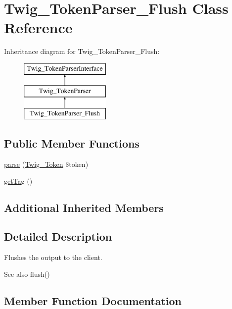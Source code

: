 \hypertarget{class_twig___token_parser___flush}{}\section{Twig\+\_\+\+Token\+Parser\+\_\+\+Flush Class Reference}
\label{class_twig___token_parser___flush}
Inheritance diagram for Twig\+\_\+\+Token\+Parser\+\_\+\+Flush\+:\begin{figure}[H]
\begin{center}
\leavevmode
\includegraphics[height=3.000000cm]{class_twig___token_parser___flush}
\end{center}
\end{figure}
\subsection*{Public Member Functions}
\begin{DoxyCompactItemize}
\item 
\hyperlink{class_twig___token_parser___flush_a5dfa2e269321584fb74e8b43dabe0efd}{parse} (\hyperlink{class_twig___token}{Twig\+\_\+\+Token} \$token)
\item 
\hyperlink{class_twig___token_parser___flush_ab86ba36154b20e6bbfa3ba705f12f9d6}{get\+Tag} ()
\end{DoxyCompactItemize}
\subsection*{Additional Inherited Members}


\subsection{Detailed Description}
Flushes the output to the client.

\begin{DoxySeeAlso}{See also}
flush() 
\end{DoxySeeAlso}


\subsection{Member Function Documentation}
\hypertarget{class_twig___token_parser___flush_ab86ba36154b20e6bbfa3ba705f12f9d6}{}
